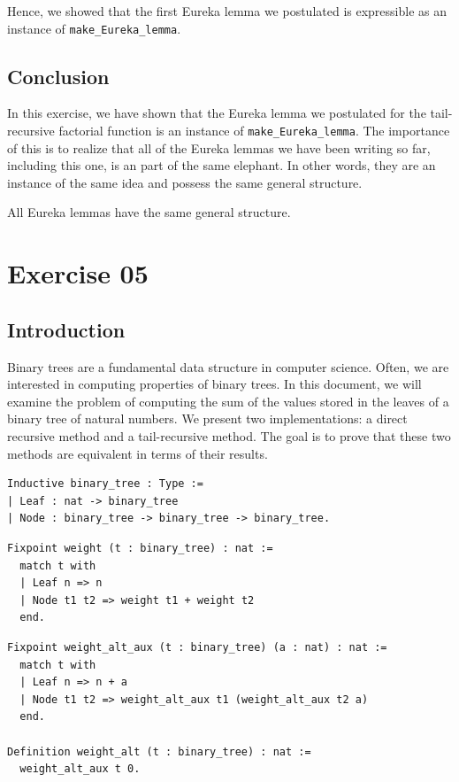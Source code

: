 \documentclass{article}
\begin{document}
Hence, we showed that the first Eureka lemma we postulated is expressible as an instance of \texttt{make\_Eureka\_lemma}.

\subsection{Conclusion}

In this exercise, we have shown that the Eureka lemma we postulated for the tail-recursive factorial function is an instance of \texttt{make\_Eureka\_lemma}. The importance of this is to realize that all of the Eureka lemmas we have been writing so far, including this one, is an part of the same elephant. In other words, they are an instance of the same idea and possess the same general structure. 

All Eureka lemmas have the same general structure. 

\section{Exercise 05}

\subsection{Introduction}

Binary trees are a fundamental data structure in computer science. Often, we are interested in computing properties of binary trees. In this document, we will examine the problem of computing the sum of the values stored in the leaves of a binary tree of natural numbers. We present two implementations: a direct recursive method and a tail-recursive method. The goal is to prove that these two methods are equivalent in terms of their results.

\begin{lstlisting}
Inductive binary_tree : Type :=
| Leaf : nat -> binary_tree
| Node : binary_tree -> binary_tree -> binary_tree.
\end{lstlisting}

\begin{lstlisting}
Fixpoint weight (t : binary_tree) : nat :=
  match t with
  | Leaf n => n
  | Node t1 t2 => weight t1 + weight t2
  end.
\end{lstlisting}

\begin{lstlisting}
Fixpoint weight_alt_aux (t : binary_tree) (a : nat) : nat :=
  match t with
  | Leaf n => n + a
  | Node t1 t2 => weight_alt_aux t1 (weight_alt_aux t2 a)
  end.

Definition weight_alt (t : binary_tree) : nat :=
  weight_alt_aux t 0.
\end{lstlisting}
\end{document}
